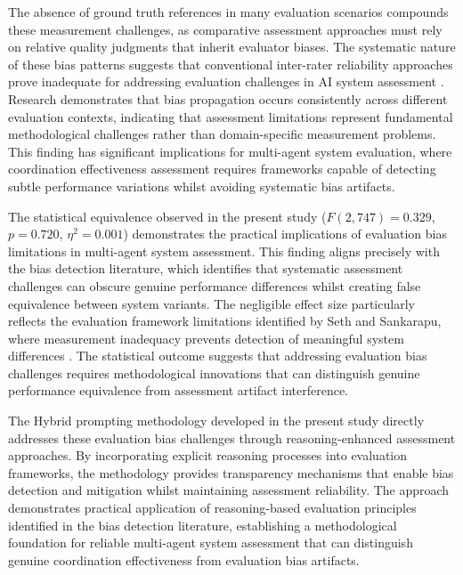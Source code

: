 The absence of ground truth references in many evaluation scenarios compounds these measurement challenges, as comparative assessment approaches must rely on relative quality judgments that inherit evaluator biases. The systematic nature of these bias patterns suggests that conventional inter-rater reliability approaches prove inadequate for addressing evaluation challenges in AI system assessment \cite{seth2025xai_metrics_gap}. Research demonstrates that bias propagation occurs consistently across different evaluation contexts, indicating that assessment limitations represent fundamental methodological challenges rather than domain-specific measurement problems. This finding has significant implications for multi-agent system evaluation, where coordination effectiveness assessment requires frameworks capable of detecting subtle performance variations whilst avoiding systematic bias artifacts.

The statistical equivalence observed in the present study ($F(2,747) = 0.329$, $p = 0.720$, $\eta^2 = 0.001$) demonstrates the practical implications of evaluation bias limitations in multi-agent system assessment. This finding aligns precisely with the bias detection literature, which identifies that systematic assessment challenges can obscure genuine performance differences whilst creating false equivalence between system variants. The negligible effect size particularly reflects the evaluation framework limitations identified by Seth and Sankarapu, where measurement inadequacy prevents detection of meaningful system differences \cite{seth2025xai_metrics_gap}. The statistical outcome suggests that addressing evaluation bias challenges requires methodological innovations that can distinguish genuine performance equivalence from assessment artifact interference.

The Hybrid prompting methodology developed in the present study directly addresses these evaluation bias challenges through reasoning-enhanced assessment approaches. By incorporating explicit reasoning processes into evaluation frameworks, the methodology provides transparency mechanisms that enable bias detection and mitigation whilst maintaining assessment reliability. The approach demonstrates practical application of reasoning-based evaluation principles identified in the bias detection literature, establishing a methodological foundation for reliable multi-agent system assessment that can distinguish genuine coordination effectiveness from evaluation bias artifacts.

